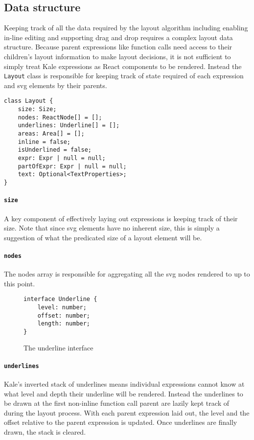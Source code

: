 \subsection{Data structure}

Keeping track of all the data required by the layout algorithm
including enabling in-line editing and supporting drag and drop requires a
complex layout data structure.
Because parent expressions like function calls need access to their children's
layout information to make layout decisions, it is not sufficient to simply
treat Kale expressions as React components to be rendered. Instead the
\texttt{Layout} class is responsible for keeping track of state required
of each expression and \ac{svg} elements by their parents.

\begin{Verbatim}[samepage, frame=lines]
class Layout {
    size: Size;
    nodes: ReactNode[] = [];
    underlines: Underline[] = [];
    areas: Area[] = [];
    inline = false;
    isUnderlined = false;
    expr: Expr | null = null;
    partOfExpr: Expr | null = null;
    text: Optional<TextProperties>;
}
\end{Verbatim}

\newcommand{\field}[1]{
	\paragraph{\texttt{#1}}
	\label{layout:#1}
}
\field{size} A key component of effectively laying out expressions is
keeping track of their size. Note that since \ac{svg} elements have no
inherent size, this is simply a suggestion of what the predicated size
of a layout element will be.

\field{nodes} The nodes array is responsible for aggregating all the
\ac{svg} nodes rendered to up to this point.

\setlength{\columnsep}{5ex}
\begin{wrapfigure}[7]{R}{30ex}
\vspace*{-\baselineskip}
\begin{Verbatim}[samepage]
interface Underline {
    level: number;
    offset: number;
    length: number;
}
\end{Verbatim}
\caption{The underline interface}
\end{wrapfigure}
\field{underlines} Kale's inverted stack of underlines means individual
expressions cannot know at what level and depth their underline will
be rendered. Instead the underlines to be drawn at the first non-inline
function call parent are lazily kept track of during the layout process. With
each parent expression laid
out, the level and the offset relative to the parent expression is updated.
Once underlines are finally drawn, the stack is cleared.

